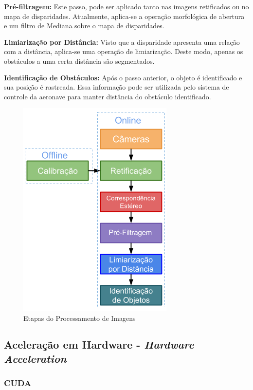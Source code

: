 \textbf{Pré-filtragem:} Este passo, pode ser aplicado tanto nas imagens retificados ou no mapa de disparidades. Atualmente, aplica-se a operação morfológica de abertura e um filtro de Mediana sobre o mapa de disparidades. 

\textbf{Limiarização por Distância:} Visto que a disparidade apresenta uma relação com a distância, aplica-se uma operação de limiarização. Deste modo, apenas os obstáculos a uma certa distância são segmentados.

\textbf{Identificação de Obstáculos:} Após o passo anterior, o objeto é identificado e sua posição é rastreada. Essa informação pode ser utilizada pelo sistema de controle da aeronave para manter distância do obstáculo identificado.

\begin{figure}[H]
	\centering
	\includegraphics[scale=0.50]{./Resources/stereo_processor_steps2.png}
	\caption{Etapas do Processamento de Imagens}
	\label{stereo_processor_steps}
\end{figure}


\subsection{Aceleração em Hardware - \textit{Hardware Acceleration}}
\subsubsection{CUDA}

